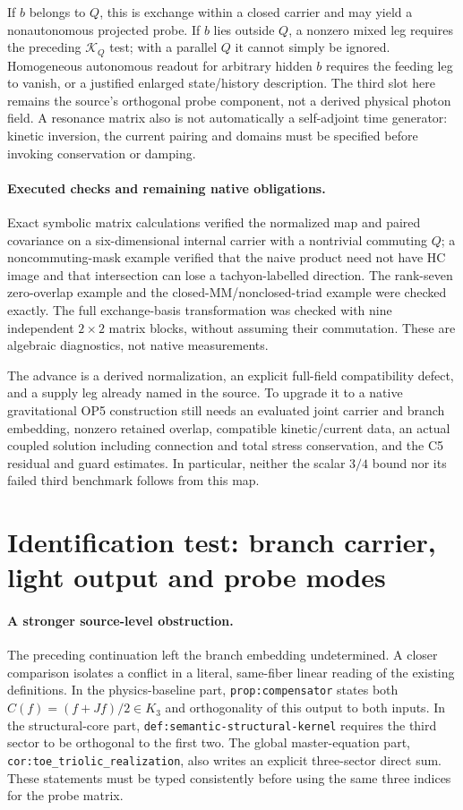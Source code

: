 \documentclass[11pt,a4paper]{article}
\begin{document}
If $b$ belongs to $Q$, this is exchange within a closed carrier and
may yield a nonautonomous projected probe. If $b$ lies outside $Q$,
a nonzero mixed leg requires the preceding $\mathcal K_Q$ test;
with a parallel $Q$ it cannot simply be ignored. Homogeneous
autonomous readout for arbitrary hidden $b$ requires the feeding
leg to vanish, or a justified enlarged state/history description.
The third slot here remains the source's orthogonal probe component,
not a derived physical photon field. A resonance matrix also is not
automatically a self-adjoint time generator: kinetic inversion,
the current pairing and domains must be specified before invoking
conservation or damping.

\paragraph{Executed checks and remaining native obligations.}
Exact symbolic matrix calculations verified the normalized map and
paired covariance on a six-dimensional internal carrier with a
nontrivial commuting $Q$; a noncommuting-mask example verified that
the naive product need not have HC image and that intersection can
lose a tachyon-labelled direction. The rank-seven zero-overlap
example and the closed-MM/nonclosed-triad example were checked
exactly. The full exchange-basis transformation was checked with
nine independent $2\times2$ matrix blocks, without assuming their
commutation. These are algebraic diagnostics, not native measurements.

The advance is a derived normalization, an explicit full-field
compatibility defect, and a supply leg already named in the source.
To upgrade it to a native gravitational OP5 construction still needs
an evaluated joint carrier and branch embedding, nonzero retained
overlap, compatible kinetic/current data, an actual coupled solution
including connection and total stress conservation, and the C5
residual and guard estimates. In particular, neither the scalar
$3/4$ bound nor its failed third benchmark follows from this map.

\section{Identification test: branch carrier, light output and probe modes}
\label{sec:branch-probe-identification-test}

\paragraph{A stronger source-level obstruction.}
The preceding continuation left the branch embedding undetermined.
A closer comparison isolates a conflict in a literal, same-fiber
linear reading of the existing definitions. In the physics-baseline
part, \texttt{prop:compensator} states both
$C(f)=(f+Jf)/2\in K_3$ and orthogonality of this output to both
inputs. In the structural-core part,
\texttt{def:semantic-structural-kernel} requires the third sector to
be orthogonal to the first two. The global master-equation part,
\texttt{cor:toe\_triolic\_realization}, also writes an explicit
three-sector direct sum. These statements must be typed consistently
before using the same three indices for the probe matrix.
\end{document}
